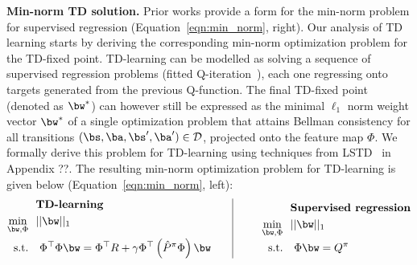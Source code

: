 \textbf{Min-norm TD solution.} Prior works provide a form for the min-norm problem for supervised regression (Equation~\ref{eqn:min_norm}, right). Our analysis of TD learning starts by deriving the corresponding min-norm optimization problem for the TD-fixed point. TD-learning can be modelled as solving a sequence of supervised regression problems (\ie fitted Q-iteration~\citep{Riedmiller2005}), each one regressing onto targets generated from the previous Q-function. The final TD-fixed point (denoted as $\bw^*$) can however still be expressed as the minimal $\ell_1$ norm weight vector $\bw^*$ of a single optimization problem that attains Bellman consistency for all transitions $(\bs, \ba, \bs', \ba') \in \mathcal{D}$, projected onto the feature map $\Phi$. We formally derive this problem for TD-learning using techniques from LSTD~\citep{lagoudakis2003least} in Appendix ??. The resulting min-norm optimization problem for TD-learning is given below (Equation~\ref{eqn:min_norm}, left):
\begin{equation}
\begin{aligned}
    &\text{\textbf{TD-learning}} \\
    \min_{\bw, \Phi}~~& ||\bw||_1 \\
    \text{s.t.}~~&~ {\Phi}^\top {\Phi} \bw = {\Phi}^\top R + \gamma {\Phi}^\top \left(\hat{P}^\pi \Phi \right) \bw
\end{aligned}
\;~~~~~ \vline\;
\begin{aligned}
    &\text{\textbf{Supervised regression}} \\
    ~~~~~~~\min_{\bw, \Phi}~~& ||\bw||_1 \\
    \text{s.t.}~~&~ {\Phi} \bw = Q^\pi %
\end{aligned}
\label{eqn:min_norm}
\end{equation}

